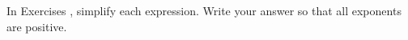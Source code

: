 {\noindent In Exercises}
{, simplify each expression. Write your answer so that all exponents are positive.}
